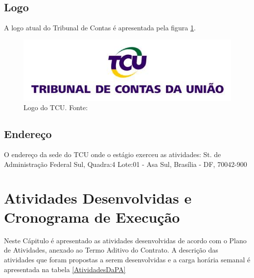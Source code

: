 \pagebreak

\section{Logo}

A logo atual do Tribunal de Contas é apresentada pela figura \ref{logoTCU}.  

\begin{figure}[h!]
	\centering
	\includegraphics[keepaspectratio=true,scale=0.5]{figuras/TCU.jpg}
	\caption{Logo do TCU. Fonte: \cite{TCUHistoria}}
	\label{logoTCU}
\end{figure}

\section{Endereço}

O endereço da sede do TCU onde o estágio exerceu as atividades:
St. de Administração Federal Sul, Quadra:4 Lote:01 - Asa Sul, Brasília - DF, 70042-900 \cite{TCUHistoria}



\chapter[Atividades Desenvolvidas e Cronograma de Execução]{Atividades Desenvolvidas e Cronograma de Execução}

Neste Cápitulo é apresentado as atividades desenvolvidas de acordo com o Plano de Atividades, anexado ao Termo Aditivo do Contrato. A descrição das atividades que foram propostas a serem desenvolvidas e a carga horária semanal é apresentada na tabela \ref{AtividadesDaPA} 

